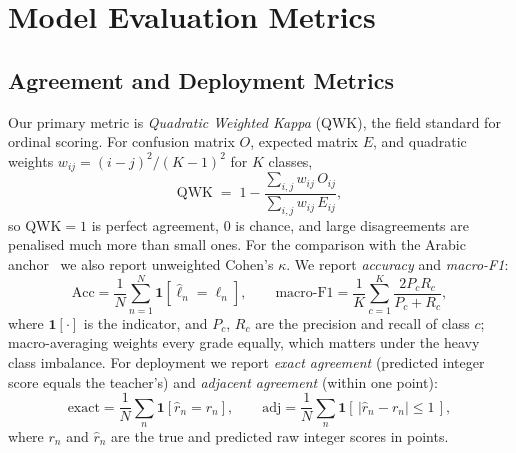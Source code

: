 \section{Model Evaluation Metrics}
\label{sec:metrics}

\subsection{Agreement and Deployment Metrics}
Our primary metric is \emph{Quadratic Weighted Kappa} (QWK), the field standard for ordinal scoring.
For confusion matrix $O$, expected matrix $E$, and quadratic weights $w_{ij}=(i-j)^2/(K-1)^2$ for $K$
classes,
\begin{equation}
\mathrm{QWK} \;=\; 1 - \frac{\sum_{i,j} w_{ij}\,O_{ij}}{\sum_{i,j} w_{ij}\,E_{ij}},
\end{equation}
so QWK${}=1$ is perfect agreement, $0$ is chance, and large disagreements are penalised much more than
small ones. For the comparison with the Arabic anchor~\citep{alaoui2024} we also report unweighted
Cohen's $\kappa$. We report \emph{accuracy} and \emph{macro-F1}:
\begin{equation}
\mathrm{Acc}=\frac{1}{N}\sum_{n=1}^{N}\mathbf{1}[\hat{\ell}_n=\ell_n],\qquad
\mathrm{macro\text{-}F1}=\frac{1}{K}\sum_{c=1}^{K}\frac{2P_cR_c}{P_c+R_c},
\end{equation}
where $\mathbf{1}[\cdot]$ is the indicator, and $P_c$, $R_c$ are the precision and recall of class $c$;
macro-averaging weights every grade equally, which matters under the heavy class imbalance. For
deployment we report \emph{exact agreement} (predicted integer score equals the teacher's) and
\emph{adjacent agreement} (within one point):
\begin{equation}
\mathrm{exact}=\frac{1}{N}\sum_n \mathbf{1}[\hat{r}_n=r_n],\qquad
\mathrm{adj}=\frac{1}{N}\sum_n \mathbf{1}[\,|\hat{r}_n-r_n|\le 1\,],
\end{equation}
where $r_n$ and $\hat{r}_n$ are the true and predicted raw integer scores in points.


